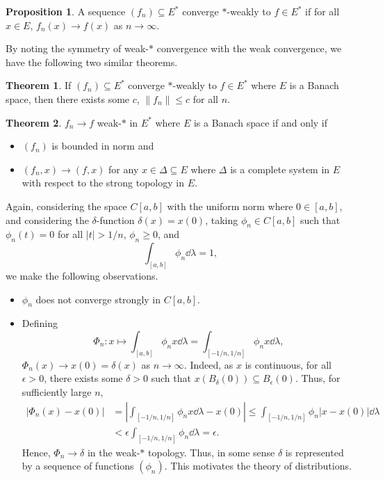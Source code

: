 \documentclass[]{article}
\theoremstyle{definition}
\newtheorem{theorem}{Theorem}
\theoremstyle{definition}
\newtheorem{proposition}{Proposition}[section]
\begin{document}
\begin{proposition}
  A sequence \((f_n) \subseteq E^*\) converge \(*\)-weakly to \(f \in E^*\) if 
  for all \(x \in E\), \(f_n(x) \to f(x)\) as \(n \to \infty\).
\end{proposition}

By noting the symmetry of weak-\(*\) convergence with the weak convergence, 
we have the following two similar theorems.

\begin{theorem}
  If \((f_n) \subseteq E^*\) converge \(*\)-weakly to \(f \in E^*\) where 
  \(E\) is a Banach space, then there exists some \(c\), \(\|f_n\| \le c\)
  for all \(n\).
\end{theorem}

\begin{theorem}
  \(f_n \to f\) weak-\(*\) in \(E^*\) where \(E\) is a Banach space if and only if 
  \begin{itemize}
    \item \((f_n)\) is bounded in norm and 
    \item \((f_n, x) \to (f, x)\) for any \(x \in \Delta \subseteq E\)
      where \(\Delta\) is a complete system in \(E\) with respect to the strong 
      topology in \(E\).
  \end{itemize}
\end{theorem}

Again, considering the space \(C[a, b]\) with the uniform norm where 
\(0 \in [a, b]\), and considering 
the \(\delta\)-function \(\delta(x) = x(0)\), taking \(\phi_n \in C[a, b]\) such that 
\(\phi_n(t) = 0\) for all \(|t| > 1 / n\), \(\phi_n \ge 0\), and 
\[\int_{[a, b]} \phi_n \dd \lambda = 1,\]
we make the following observations. 
\begin{itemize}
  \item \(\phi_n\) does not converge strongly in \(C[a, b]\).
  \item Defining 
    \[\Phi_n : x \mapsto \int_{[a, b]} \phi_n x \dd\lambda = \int_{[-1/n, 1/n]} \phi_n x \dd \lambda,\]
    \(\Phi_n(x) \to x(0) = \delta(x)\) as \(n \to \infty\). Indeed, as \(x\) is 
    continuous, for all \(\epsilon > 0\), there exists some \(\delta > 0\) 
    such that \(x(B_\delta(0)) \subseteq B_\epsilon(0)\). Thus, for sufficiently 
    large \(n\),
    \[\begin{split}
      |\Phi_n(x) - x(0)| & = \left|\int_{[-1/ n, 1/n]} \phi_n x \dd \lambda - x(0) \right|
      \le \int_{[-1/n, 1/ n]} \phi_n |x - x(0)| \dd \lambda\\
      & < \epsilon \int_{[-1/n, 1/ n]} \phi_n \dd \lambda = \epsilon.
    \end{split}\]
    Hence, \(\Phi_n \to \delta\) in the weak-\(*\) topology.
    Thus, in some sense \(\delta\) is represented by a sequence of functions 
    \((\phi_n)\). This motivates the theory of distributions.
\end{itemize}
\end{document}
